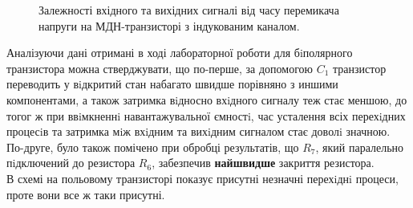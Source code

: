 \documentclass[a4paper,14pt]{extreport}
\begin{document}
\begin{figure}[h!]
	\caption{Залежності вхідного та вихідних сигналі від часу перемикача напруги на МДН-транзисторі з 
	індукованим каналом.}
	\label{ris3}
\end{figure}


\clearpage 
\newpage
\begin{center}
\textbf{}
\end{center}
Аналізуючи дані отримані в ході лабораторної роботи для 
бiполярного транзистора можна стверджувати, що по-перше, за допомогою $C_1$ транзистор  переводить  у вiдкритий стан набагато швидше порівняно з иншими компонентами, а також затримка вiдносно  вхiдного сигналу теж стає меншою, до тогог ж при ввiмкненнi навантажувальної ємностi, час усталення всіх перехiдних процесiв та затримка мiж вхiдним та вихiдним сигналом стає доволi значною. По-друге, було також помічено при обробці результатів, що $R_7$, який паралельно пiдключений до резистора $R_6$, забезпечив \textbf{найшвидше} закриття резистора.\\


В схемі на польовому транзисторі показує присутні незначні перехiднi процеси, проте вони все ж таки присутні.
\end{document}
